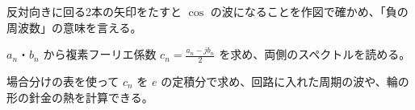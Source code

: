\begin{furikaeri}
\begin{checklist}
\item 反対向きに回る2本の矢印をたすと $\cos$ の波になることを作図で確かめ、「負の周波数」の意味を言える。
\item $a_n$・$b_n$ から複素フーリエ係数 $c_n=\frac{a_n-jb_n}{2}$ を求め、両側のスペクトルを読める。
\item 場合分けの表を使って $c_n$ を $e$ の定積分で求め、回路に入れた周期の波や、輪の形の針金の熱を計算できる。
\end{checklist}
\end{furikaeri}

